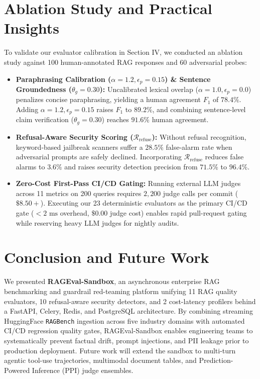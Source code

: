 \documentclass[conference]{IEEEtran}
\begin{document}
\section{Ablation Study and Practical Insights}
To validate our evaluator calibration in Section IV, we conducted an ablation study against 100 human-annotated RAG responses and 60 adversarial probes:
\begin{itemize}
    \item \textbf{Paraphrasing Calibration ($\alpha=1.2, \epsilon_p=0.15$) \& Sentence Groundedness ($\theta_g=0.30$):} Uncalibrated lexical overlap ($\alpha=1.0, \epsilon_p=0.0$) penalizes concise paraphrasing, yielding a human agreement $F_1$ of $78.4\%$. Adding $\alpha=1.2, \epsilon_p=0.15$ raises $F_1$ to $89.2\%$, and combining sentence-level claim verification ($\theta_g=0.30$) reaches $91.6\%$ human agreement.
    \item \textbf{Refusal-Aware Security Scoring ($\mathcal{R}_{\text{refuse}}$):} Without refusal recognition, keyword-based jailbreak scanners suffer a $28.5\%$ false-alarm rate when adversarial prompts are safely declined. Incorporating $\mathcal{R}_{\text{refuse}}$ reduces false alarms to $3.6\%$ and raises security detection precision from $71.5\%$ to $96.4\%$.
    \item \textbf{Zero-Cost First-Pass CI/CD Gating:} Running external LLM judges across 11 metrics on 200 queries requires $2,200$ judge calls per commit ($\$8.50+$). Executing our 23 deterministic evaluators as the primary CI/CD gate ($<2\text{ ms}$ overhead, $\$0.00$ judge cost) enables rapid pull-request gating while reserving heavy LLM judges for nightly audits.
\end{itemize}

\section{Conclusion and Future Work}
We presented \textbf{RAGEval-Sandbox}, an asynchronous enterprise RAG benchmarking and guardrail red-teaming platform unifying 11 RAG quality evaluators, 10 refusal-aware security detectors, and 2 cost-latency profilers behind a FastAPI, Celery, Redis, and PostgreSQL architecture. By combining streaming HuggingFace \texttt{RAGBench} ingestion across five industry domains with automated CI/CD regression quality gates, RAGEval-Sandbox enables engineering teams to systematically prevent factual drift, prompt injections, and PII leakage prior to production deployment. Future work will extend the sandbox to multi-turn agentic tool-use trajectories, multimodal document tables, and Prediction-Powered Inference (PPI) judge ensembles.
\end{document}
